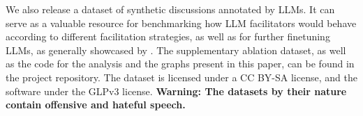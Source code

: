 %

We also release \vmd\datasetlink a dataset of synthetic discussions annotated by \acp{LLM}. It can serve as a valuable resource for benchmarking how \ac{LLM} facilitators would behave according to different facilitation strategies, as well as for further finetuning \acp{LLM}, as generally showcased by \citet{ulmer2024}. The supplementary ablation dataset, as well as the code for the analysis and the graphs present in this paper, can be found in the project repository\analysislink. The dataset is licensed under a CC BY-SA license, and the software under the \ac{GLP}v3 license. \textbf{Warning: The datasets by their nature contain offensive and hateful speech.}